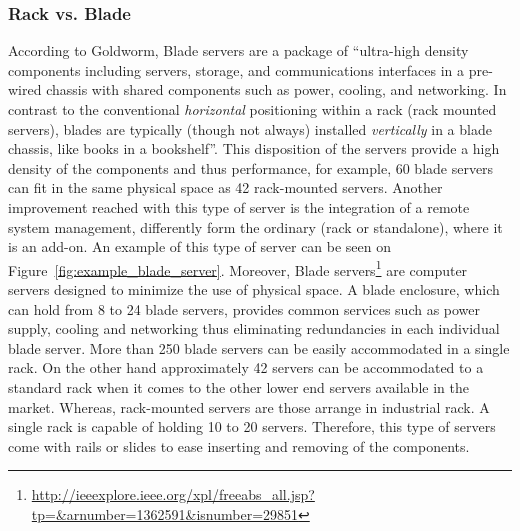             \subsubsection*{Rack vs. Blade}
                According to Goldworm\cite{barbAnne07}, Blade servers are a package of ``ultra-high density components including servers, storage, and communications interfaces in a pre-wired chassis with shared components such as power, cooling, and networking. In contrast to the conventional \emph{horizontal} positioning within a rack (rack mounted servers), blades are typically (though not always) installed \emph{vertically} in a blade chassis, like books in a bookshelf''. This disposition of the servers provide a high density of the components and thus performance, for example, 60 blade servers can fit in the same physical space as 42 rack-mounted servers. Another improvement reached with this type of server is the integration of a remote system management, differently form the ordinary (rack or standalone), where it is an add-on. An example of this type of server can be seen on Figure~\ref{fig:example_blade_server}. Moreover, Blade servers\footnote{\url{http://ieeexplore.ieee.org/xpl/freeabs_all.jsp?tp=&arnumber=1362591&isnumber=29851}} are computer servers designed to minimize the use of physical space. A blade enclosure, which can hold from 8 to 24 \cite{Rehn08} blade servers, provides common services such as power supply, cooling and networking thus eliminating redundancies in each individual blade server. More than 250 blade servers can be easily accommodated in a single rack. On the other hand approximately 42 servers can be accommodated to a standard rack when it comes to the other lower end servers available in the market. Whereas, rack-mounted servers are those arrange in industrial rack. A single rack is capable of holding 10 to 20 servers. Therefore, this type of servers come with rails or slides to ease inserting and removing of the components\cite{Bailey09}.
